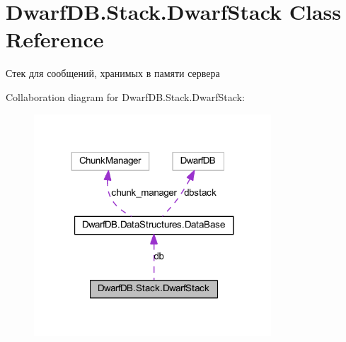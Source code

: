 \hypertarget{class_dwarf_d_b_1_1_stack_1_1_dwarf_stack}{
\section{DwarfDB.Stack.DwarfStack Class Reference}
\label{class_dwarf_d_b_1_1_stack_1_1_dwarf_stack}
}


Стек для сообщений, хранимых в памяти сервера  




Collaboration diagram for DwarfDB.Stack.DwarfStack:
\nopagebreak
\begin{figure}[H]
\begin{center}
\leavevmode
\includegraphics[width=251pt]{class_dwarf_d_b_1_1_stack_1_1_dwarf_stack__coll__graph}
\end{center}
\end{figure}
